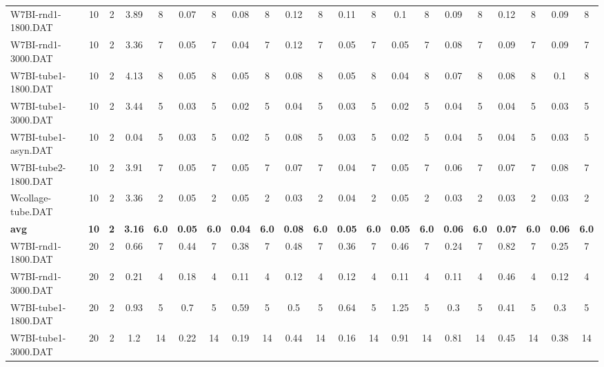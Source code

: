 \begin{sidewaystable}[!ht]
{\begin{tabular}{lcccccccccccccccccccc}
W7BI-rnd1-1800.DAT & 10 & 2 & 3.89 & 8 &  \textcolor{blue2}{0.07} & 8 & 0.08 & 8 & 0.12 & 8 & 0.11 & 8 & 0.1 & 8 & 0.09 & 8 & 0.12 & 8 & 0.09 & 8 \\
W7BI-rnd1-3000.DAT & 10 & 2 & 3.36 & 7 & 0.05 & 7 &  \textcolor{blue2}{0.04} & 7 & 0.12 & 7 & 0.05 & 7 & 0.05 & 7 & 0.08 & 7 & 0.09 & 7 & 0.09 & 7 \\
W7BI-tube1-1800.DAT & 10 & 2 & 4.13 & 8 & 0.05 & 8 & 0.05 & 8 & 0.08 & 8 & 0.05 & 8 &  \textcolor{blue2}{0.04} & 8 & 0.07 & 8 & 0.08 & 8 & 0.1 & 8 \\
W7BI-tube1-3000.DAT & 10 & 2 & 3.44 & 5 & 0.03 & 5 &  \textcolor{blue2}{0.02} & 5 & 0.04 & 5 & 0.03 & 5 &  \textcolor{blue2}{0.02} & 5 & 0.04 & 5 & 0.04 & 5 & 0.03 & 5 \\
W7BI-tube1-asyn.DAT & 10 & 2 & 0.04 & 5 & 0.03 & 5 &  \textcolor{blue2}{0.02} & 5 & 0.08 & 5 & 0.03 & 5 &  \textcolor{blue2}{0.02} & 5 & 0.04 & 5 & 0.04 & 5 & 0.03 & 5 \\
W7BI-tube2-1800.DAT & 10 & 2 & 3.91 & 7 & 0.05 & 7 & 0.05 & 7 & 0.07 & 7 &  \textcolor{blue2}{0.04} & 7 & 0.05 & 7 & 0.06 & 7 & 0.07 & 7 & 0.08 & 7 \\
Wcollage-tube.DAT & 10 & 2 & 3.36 & 2 & 0.05 & 2 & 0.05 & 2 &  \textcolor{blue2}{0.03} & 2 & 0.04 & 2 & 0.05 & 2 &  \textcolor{blue2}{0.03} & 2 &  \textcolor{blue2}{0.03} & 2 &  \textcolor{blue2}{0.03} & 2 \\
\cline{1-21} \textbf{avg} & \textbf{10} & \textbf{2} & \textbf{3.16} & \textbf{6.0} & \textbf{0.05} & \textbf{6.0} & \textbf{0.04} & \textbf{6.0} & \textbf{0.08} & \textbf{6.0} & \textbf{0.05} & \textbf{6.0} & \textbf{0.05} & \textbf{6.0} & \textbf{0.06} & \textbf{6.0} & \textbf{0.07} & \textbf{6.0} & \textbf{0.06} & \textbf{6.0} \\ \cline{1-21}
W7BI-rnd1-1800.DAT & 20 & 2 & 0.66 & 7 & 0.44 & 7 & 0.38 & 7 & 0.48 & 7 & 0.36 & 7 & 0.46 & 7 &  \textcolor{blue2}{0.24} & 7 & 0.82 & 7 & 0.25 & 7 \\
W7BI-rnd1-3000.DAT & 20 & 2 & 0.21 & 4 & 0.18 & 4 &  \textcolor{blue2}{0.11} & 4 & 0.12 & 4 & 0.12 & 4 &  \textcolor{blue2}{0.11} & 4 &  \textcolor{blue2}{0.11} & 4 & 0.46 & 4 & 0.12 & 4 \\
W7BI-tube1-1800.DAT & 20 & 2 & 0.93 & 5 & 0.7 & 5 & 0.59 & 5 & 0.5 & 5 & 0.64 & 5 & 1.25 & 5 &  \textcolor{blue2}{0.3} & 5 & 0.41 & 5 &  \textcolor{blue2}{0.3} & 5 \\
W7BI-tube1-3000.DAT & 20 & 2 & 1.2 & 14 & 0.22 & 14 & 0.19 & 14 & 0.44 & 14 &  \textcolor{blue2}{0.16} & 14 & 0.91 & 14 & 0.81 & 14 & 0.45 & 14 & 0.38 & 14 \\

\end{tabular}}
\end{sidewaystable}
